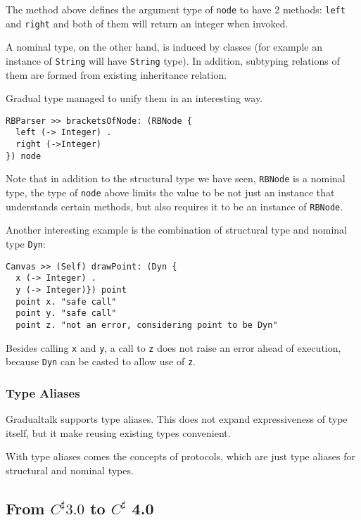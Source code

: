 The method above defines the argument type of \texttt{node} to have 2 methods:
\texttt{left} and \texttt{right} and both of them will return an integer when invoked.

A nominal type, on the other hand, is induced by classes
(for example an instance of \texttt{String} will have \texttt{String} type).
In addition, subtyping relations of them are formed from existing inheritance relation.

Gradual type managed to unify them in an interesting way.

\begin{verbatim}
RBParser >> bracketsOfNode: (RBNode {
  left (-> Integer) .
  right (->Integer)
}) node
\end{verbatim}

Note that in addition to the structural type we have seen,
\texttt{RBNode} is a nominal type, the type of \texttt{node} above
limits the value to be not just an instance that understands certain methods,
but also requires it to be an instance of \texttt{RBNode}.

Another interesting example is the combination of structural type
and nominal type \texttt{Dyn}:

\begin{verbatim}
Canvas >> (Self) drawPoint: (Dyn {
  x (-> Integer) .
  y (-> Integer)}) point
  point x. "safe call"
  point y. "safe call"
  point z. "not an error, considering point to be Dyn"
\end{verbatim}

Besides calling \texttt{x} and \texttt{y}, a call to \texttt{z} does not
raise an error ahead of execution, because \texttt{Dyn} can be casted to allow use of
\texttt{z}.

\subsubsection{Type Aliases}

Gradualtalk supports type aliases. This does not expand expressiveness of type itself,
but it make reusing existing types convenient.

With type aliases comes the concepts of protocols, which are just type aliases
for structural and nominal types.

\newcommand{\csharp}{C^\sharp}
\subsection{From $\csharp 3.0$ to $\csharp$ 4.0}


